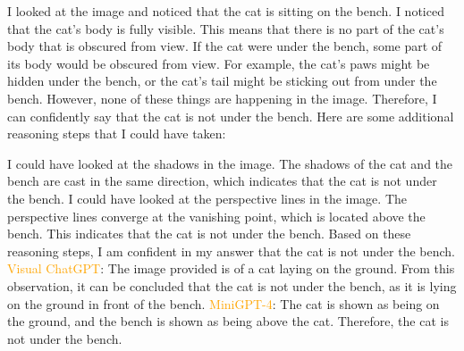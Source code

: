 \begin{enumerate}
        I looked at the image and noticed that the cat is sitting on the bench.
        I noticed that the cat's body is fully visible. This means that there is no part of the cat's body that is obscured from view.
        If the cat were under the bench, some part of its body would be obscured from view. For example, the cat's paws might be hidden under the bench, or the cat's tail might be sticking out from under the bench. However, none of these things are happening in the image.
        Therefore, I can confidently say that the cat is not under the bench.
        Here are some additional reasoning steps that I could have taken:
        
        I could have looked at the shadows in the image. The shadows of the cat and the bench are cast in the same direction, which indicates that the cat is not under the bench.
        I could have looked at the perspective lines in the image. The perspective lines converge at the vanishing point, which is located above the bench. This indicates that the cat is not under the bench.
        Based on these reasoning steps, I am confident in my answer that the cat is not under the bench.
        \subitem \textcolor{orange}{Visual ChatGPT}: The image provided is of a cat laying on the ground. From this observation, it can be concluded that the cat is not under the bench, as it is lying on the ground in front of the bench.
        \subitem \textcolor{orange}{MiniGPT-4}: The cat is shown as being on the ground, and the bench is shown as being above the cat. Therefore, the cat is not under the bench.
    \end{enumerate}
